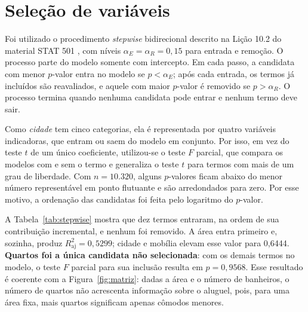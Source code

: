 \documentclass[12pt,a4paper]{article}
\newcommand{\Rtwoadj}{\ensuremath{R^2_{\text{aj}}}}
\begin{document}
\section{Seleção de variáveis}
\label{sec:selecao}

Foi utilizado o procedimento \textit{stepwise} bidirecional descrito na Lição 10.2 do material STAT 501 \cite{stat501-10}, com níveis $\alpha_E=\alpha_R=0{,}15$ para entrada e remoção. O processo parte do modelo somente com intercepto. Em cada passo, a candidata com menor $p$-valor entra no modelo se $p<\alpha_E$; após cada entrada, os termos já incluídos são reavaliados, e aquele com maior $p$-valor é removido se $p>\alpha_R$. O processo termina quando nenhuma candidata pode entrar e nenhum termo deve sair.

Como \textit{cidade} tem cinco categorias, ela é representada por quatro variáveis indicadoras, que entram ou saem do modelo em conjunto. Por isso, em vez do teste $t$ de um único coeficiente, utilizou-se o teste $F$ parcial, que compara os modelos com e sem o termo e generaliza o teste $t$ para termos com mais de um grau de liberdade. Com $n=10.320$, alguns $p$-valores ficam abaixo do menor número representável em ponto flutuante e são arredondados para zero. Por esse motivo, a ordenação das candidatas foi feita pelo logaritmo do $p$-valor.



\begin{table}[H]
\centering
\caption{Trajetória do \textit{stepwise} ($\alpha_E=\alpha_R=0{,}15$). Nenhum termo foi removido após entrar.}
\label{tab:stepwise}
\footnotesize

\end{table}

A Tabela~\ref{tab:stepwise} mostra que dez termos entraram, na ordem de sua contribuição incremental, e nenhum foi removido. A área entra primeiro e, sozinha, produz \Rtwoadj$=0{,}5299$; cidade e mobília elevam esse valor para 0,6444. \textbf{Quartos foi a única candidata não selecionada}: com os demais termos no modelo, o teste $F$ parcial para sua inclusão resulta em $p=0{,}9568$. Esse resultado é coerente com a Figura~\ref{fig:matriz}: dadas a área e o número de banheiros, o número de quartos não acrescenta informação sobre o aluguel, pois, para uma área fixa, mais quartos significam apenas cômodos menores.
\end{document}
